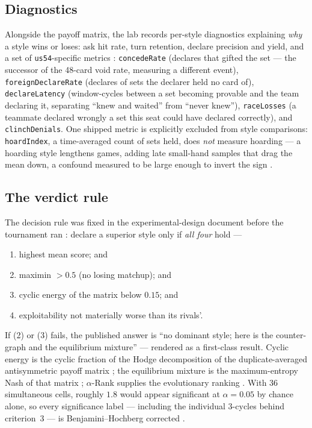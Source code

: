 \documentclass[11pt]{article}
\newcommand{\code}[1]{\texttt{#1}}
\newcommand{\usff}{\code{us54}}
\begin{document}
\subsection{Diagnostics}
\label{sec:metrics}

Alongside the payoff matrix, the lab records per-style diagnostics explaining \emph{why} a
style wins or loses: ask hit rate, turn retention, declare precision and yield, and a set of
\usff{}-specific metrics \cite{styles}: \code{concedeRate} (declares that gifted the set ---
the successor of the 48-card void rate, measuring a different event), \code{foreignDeclareRate}
(declares of sets the declarer held no card of), \code{declareLatency} (window-cycles between
a set becoming provable and the team declaring it, separating ``knew and waited'' from ``never
knew''), \code{raceLosses} (a teammate declared wrongly a set this seat could have declared
correctly), and \code{clinchDenials}. One shipped metric is explicitly excluded from style
comparisons: \code{hoardIndex}, a time-averaged count of sets held, does \emph{not} measure
hoarding --- a hoarding style lengthens games, adding late small-hand samples that drag the
mean down, a confound measured to be large enough to invert the sign \cite{styles}.

\subsection{The verdict rule}
\label{sec:verdict}

The decision rule was fixed in the experimental-design document before the tournament ran
\cite{botlab}: declare a superior style only if \emph{all four} hold ---

\begin{enumerate}
\item highest mean score; and
\item maximin $> 0.5$ (no losing matchup); and
\item cyclic energy of the matrix below $0.15$; and
\item exploitability not materially worse than its rivals'.
\end{enumerate}

If (2) or (3) fails, the published answer is ``no dominant style; here is the counter-graph
and the equilibrium mixture'' --- rendered as a first-class result. Cyclic energy is the
cyclic fraction of the Hodge decomposition of the duplicate-averaged antisymmetric payoff
matrix \cite{jiang2011,balduzzi2018}; the equilibrium mixture is the maximum-entropy Nash of
that matrix \cite{balduzzi2018}; $\alpha$-Rank supplies the evolutionary ranking
\cite{omidshafiei2019}. With 36 simultaneous cells, roughly $1.8$ would appear significant at
$\alpha = 0.05$ by chance alone, so every significance label --- including the individual
3-cycles behind criterion~3 --- is Benjamini--Hochberg corrected \cite{benjamini1995}.
\end{document}
